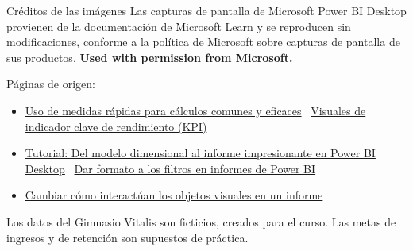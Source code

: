 \documentclass[aspectratio=169,11pt]{beamer}
\newcommand{\urlrapidas}{https://learn.microsoft.com/es-es/power-bi/transform-model/desktop-quick-measures}
\newcommand{\urlkpi}{https://learn.microsoft.com/es-es/power-bi/visuals/power-bi-visualization-kpi}
\newcommand{\urlformatofiltros}{https://learn.microsoft.com/es-es/power-bi/create-reports/power-bi-report-filter}
\newcommand{\urlinteracciones}{https://learn.microsoft.com/es-es/power-bi/create-reports/service-reports-visual-interactions}
\newcommand{\urltutorial}{https://learn.microsoft.com/es-es/power-bi/create-reports/desktop-dimensional-model-report}
\begin{document}
\begin{frame}[t]{Créditos de las imágenes}
  \scriptsize
  Las capturas de pantalla de Microsoft Power BI Desktop provienen de la
  documentación de Microsoft Learn y se reproducen sin modificaciones,
  conforme a la política de Microsoft sobre capturas de pantalla de sus
  productos. \textbf{Used with permission from Microsoft.}
  \vspace{0.15cm}

  Páginas de origen:
  \begin{itemize}
    \scriptsize
    \item \href{\urlrapidas}{Uso de medidas rápidas para cálculos comunes y eficaces}
      \textperiodcentered\ \href{\urlkpi}{Visuales de indicador clave de rendimiento (KPI)}
    \item \href{\urltutorial}{Tutorial: Del modelo dimensional al informe impresionante en Power BI Desktop}
      \textperiodcentered\ \href{\urlformatofiltros}{Dar formato a los filtros en informes de Power BI}
    \item \href{\urlinteracciones}{Cambiar cómo interactúan los objetos visuales en un informe}
  \end{itemize}
  \vspace{0.1cm}
  Los datos del Gimnasio Vitalis son ficticios, creados para el curso.
  Las metas de ingresos y de retención son supuestos de práctica.
\end{frame}

{
\begin{frame}
\end{frame}
}
\end{document}
